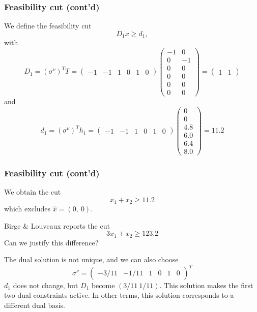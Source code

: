 \documentclass{beamer}
\begin{document}
\begin{frame}
	\frametitle{Feasibility cut (cont'd)}
	
	We define the feasibility cut
	\[
	D_1 x \geq d_1,
	\]
	with
	\[
	D_1 = (\sigma^{\nu})^T T
	= \begin{pmatrix} -1 & -1 & 1 & 0 & 1 & 0 \end{pmatrix}
	\begin{pmatrix}
	-1 &  0 \\
	0 & -1 \\
	0 &  0 \\
	0 &  0 \\
	0 &  0 \\
	0 &  0
	\end{pmatrix}
	= \begin{pmatrix} 1 & 1 \end{pmatrix}
	\]
	and
	\[
	d_1 = (\sigma^{\nu})^T h_1
	= \begin{pmatrix} -1 & -1 & 1 & 0 & 1 & 0 \end{pmatrix}
	\begin{pmatrix} 0 \\ 0 \\ 4.8 \\ 6.0 \\ 6.4 \\ 8.0 \end{pmatrix} = 11.2
	\]
	
\end{frame}

\begin{frame}
	\frametitle{Feasibility cut (cont'd)}
	
	We obtain the cut
	\[
	x_1 + x_2 \geq 11.2
	\]
	which excludes $\hat{x} = (0,\ 0)$.
	
	\mbox{}
	
	Birge \& Louveaux reports the cut
	\[
	3x_1 + x_2 \geq 123.2
	\]
	Can we justify this difference?
	
	\mbox{}
	
	The dual solution is not unique, and we can also choose
	\[
	\sigma^{\nu} = \begin{pmatrix} -3/11 & -1/11 & 1 & 0 & 1 & 0 \end{pmatrix}^T
	\]
	$d_1$ does not change, but $D_1$ become $(3/11 \ 1/11)$.
	This solution makes the first two dual constraints active. In other terms, this solution corresponds to a different dual basis.
	
\end{frame}
\end{document}
